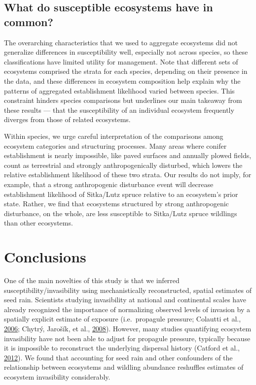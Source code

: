\documentclass[
]{article}
\begin{document}
\hypertarget{what-do-susceptible-ecosystems-have-in-common}{%
\subsection{What do susceptible ecosystems have in common?}\label{what-do-susceptible-ecosystems-have-in-common}}

The overarching characteristics that we used to aggregate ecosystems did not generalize differences in susceptibility well, especially not across species, so these classifications have limited utility for management.
Note that different sets of ecosystems comprised the strata for each species, depending on their presence in the data, and these differences in ecosystem composition help explain why the patterns of aggregated establishment likelihood varied between species.
This constraint hinders species comparisons but underlines our main takeaway from these results --- that the susceptibility of an individual ecosystem frequently diverges from those of related ecosystems.

Within species, we urge careful interpretation of the comparisons among ecosystem categories and structuring processes.
Many areas where conifer establishment is nearly impossible, like paved surfaces and annually plowed fields, count as terrestrial and strongly anthropogenically disturbed, which lowers the relative establishment likelihood of these two strata.
Our results do not imply, for example, that a strong anthropogenic disturbance event will decrease establishment likelihood of Sitka/Lutz spruce relative to an ecosystem's prior state.
Rather, we find that ecosystems structured by strong anthropogenic disturbance, on the whole, are less susceptible to Sitka/Lutz spruce wildlings than other ecosystems.

\hypertarget{conclusions}{%
\section{Conclusions}\label{conclusions}}

One of the main novelties of this study is that we inferred susceptibility/invasibility using mechanistically reconstructed, spatial estimates of seed rain.
Scientists studying invasibility at national and continental scales have already recognized the importance of normalizing observed levels of invasion by a spatially explicit estimate of exposure (i.e.~propagule pressure; Colautti et al., \protect\hyperlink{ref-colauttiPropagulePressureNull2006}{2006}; Chytrý, Jarošík, et al., \protect\hyperlink{ref-chytrySeparatingHabitatInvasibility2008}{2008}).
However, many studies quantifying ecosystem invasibility have not been able to adjust for propagule pressure, typically because it is impossible to reconstruct the underlying dispersal history (Catford et al., \protect\hyperlink{ref-catfordQuantifyingLevelsBiological2012}{2012}).
We found that accounting for seed rain and other confounders of the relationship between ecosystems and wildling abundance reshuffles estimates of ecosystem invasibility considerably.
\end{document}
